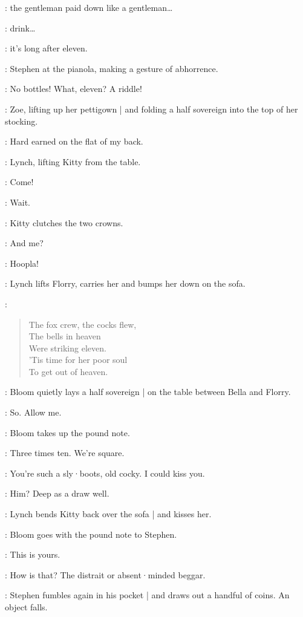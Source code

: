 \Zoe:
the gentleman paid down like a gentleman…

\Lynch:
drink…

\Bella:
it's long after eleven.

:
Stephen at the pianola,
making a gesture of abhorrence.

\Stephen:
No bottles!
What,
eleven?
A riddle!

:
Zoe,
lifting up her pettigown |
and folding a half sovereign into the top of her stocking.

\Zoe:
Hard earned on the flat of my back.

:
Lynch,
lifting Kitty from the table.

\Lynch:
Come!

\Kitty:
Wait.

:
Kitty clutches the two crowns.

\Florry:
And me?

\Lynch:
Hoopla!

:
Lynch lifts Florry,
carries her and bumps her down on the sofa.

\Stephen:
\begin{verse}
    The fox crew, the cocks flew,\\
    The bells in heaven\\
    Were striking eleven.\\
%
    'Tis time for her poor soul\\
    To get out of heaven.
\end{verse}

:
Bloom quietly lays a half sovereign |
on the table between Bella and Florry.

\Bloom:
So.
Allow me.

:
Bloom takes up the pound note.

\Bloom:
Three times ten.
We're square.

\Bella:
You're such a sly·boots,
old cocky.
I could kiss you.

\Zoe:
Him?
Deep as a draw well.

:
Lynch bends Kitty back over the sofa |
and kisses her.

:
Bloom goes with the pound note to Stephen.

\Bloom:
This is yours.

\Stephen:
How is that?
The distrait or absent·minded beggar.

:
Stephen fumbles again in his pocket |
and draws out a handful of coins.
An object falls.

